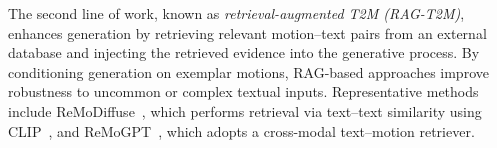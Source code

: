 \documentclass[10pt,journal,compsoc]{IEEEtran}
\begin{document}
The second line of work, known as \emph{retrieval-augmented T2M (RAG-T2M)}, enhances generation by retrieving relevant motion–text pairs from an external database and injecting the retrieved evidence into the generative process. By conditioning generation on exemplar motions, RAG-based approaches improve robustness to uncommon or complex textual inputs. Representative methods include ReMoDiffuse~\cite{remodiffuse}, which performs retrieval via text–text similarity using CLIP~\cite{clip}, and ReMoGPT~\cite{remogpt}, which adopts a cross-modal text–motion retriever.

\begin{table}[t]
\centering
\caption{Comparison of different architecture designs.}
\setlength{\tabcolsep}{8pt}
\end{table}
\end{document}
